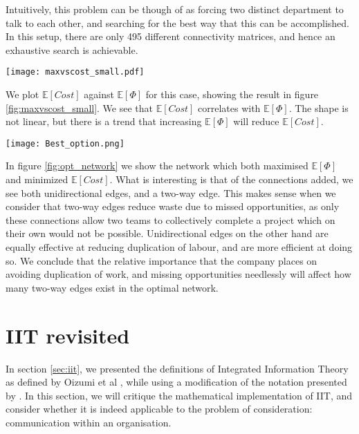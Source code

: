 Intuitively, this problem can be though of as forcing two distinct department to talk to each other, and searching for the best way that this can be accomplished. In this setup, there are only 495 different connectivity matrices, and hence an exhaustive search is achievable.



\begin{SCfigure}
	\centering
	\texttt{[image: maxvscost\_small.pdf]}
	\caption{We plot  $\mathbb{E}[Cost]$ against $\mathbb{E}[\Phi]$ for connectivity matrices where we add 4 directed edges to the network shown in figure \ref{fig:diagram2}}
	\label{fig:maxvscost_small}
\end{SCfigure}

We plot $\mathbb{E}[Cost]$ against $\mathbb{E}[\Phi]$ for this case, showing the result in figure \ref{fig:maxvscost_small}. We see that $\mathbb{E}[Cost]$ correlates with $\mathbb{E}[\Phi]$. The shape is not linear, but there is a trend that increasing $\mathbb{E}[\Phi]$ will reduce $\mathbb{E}[Cost]$.

\begin{SCfigure}
	\centering
	\texttt{[image: Best\_option.png]}
	\caption{We show the network which generated both the smallest $\mathbb{E}[Cost]$, and the largest $\mathbb{E}[\Phi]$. The two way link between $B$ and $D$ allows the network to have one combination of teams which can complete the project requiring all skills. The other one way links from $D$ affect results by minimizing duplication of work.}
	\label{fig:opt_network}
\end{SCfigure}

In figure \ref{fig:opt_network} we show the network which both maximised $\mathbb{E}[\Phi]$ and minimized $\mathbb{E}[Cost]$. What is interesting is that of the connections added, we see both unidirectional edges, and a two-way edge. This makes sense when we consider that two-way edges reduce waste due to missed opportunities, as only these connections allow two teams to collectively complete a project which on their own would not be possible. Unidirectional edges on the other hand are equally effective at reducing duplication of labour, and are more efficient at doing so. We conclude that the relative importance that the company places on avoiding duplication of work, and missing opportunities needlessly will affect how many two-way edges exist in the optimal network.


\section{IIT revisited}
In section \ref{sec:iit}, we presented the definitions of Integrated Information Theory as defined by Oizumi et al \cite{oizumi2014phenomenology}, while using a modification of the notation presented by \cite{krohn2016computing}. In this section, we will critique the mathematical implementation of IIT, and consider whether it is indeed applicable to the problem of consideration: communication within an organisation.

